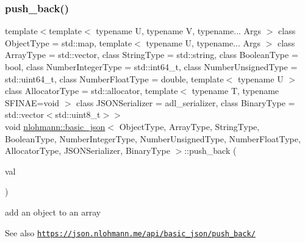 \subsubsection{\texorpdfstring{push\+\_\+back()}{push\_back()}\hspace{0.1cm}{\footnotesize\ttfamily [2/4]}}
{\footnotesize\ttfamily template$<$template$<$ typename U, typename V, typename... Args $>$ class Object\+Type = std\+::map, template$<$ typename U, typename... Args $>$ class Array\+Type = std\+::vector, class String\+Type  = std\+::string, class Boolean\+Type  = bool, class Number\+Integer\+Type  = std\+::int64\+\_\+t, class Number\+Unsigned\+Type  = std\+::uint64\+\_\+t, class Number\+Float\+Type  = double, template$<$ typename U $>$ class Allocator\+Type = std\+::allocator, template$<$ typename T, typename S\+F\+I\+N\+A\+E=void $>$ class J\+S\+O\+N\+Serializer = adl\+\_\+serializer, class Binary\+Type  = std\+::vector$<$std\+::uint8\+\_\+t$>$$>$ \\
void \hyperlink{classnlohmann_1_1basic__json}{nlohmann\+::basic\+\_\+json}$<$ Object\+Type, Array\+Type, String\+Type, Boolean\+Type, Number\+Integer\+Type, Number\+Unsigned\+Type, Number\+Float\+Type, Allocator\+Type, J\+S\+O\+N\+Serializer, Binary\+Type $>$\+::push\+\_\+back (\begin{DoxyParamCaption}\item[{const \hyperlink{classnlohmann_1_1basic__json}{basic\+\_\+json}$<$ Object\+Type, Array\+Type, String\+Type, Boolean\+Type, Number\+Integer\+Type, Number\+Unsigned\+Type, Number\+Float\+Type, Allocator\+Type, J\+S\+O\+N\+Serializer, Binary\+Type $>$ \&}]{val }\end{DoxyParamCaption})\hspace{0.3cm}{\ttfamily [inline]}}



add an object to an array 

\begin{DoxySeeAlso}{See also}
\href{https://json.nlohmann.me/api/basic_json/push_back/}{\tt https\+://json.\+nlohmann.\+me/api/basic\+\_\+json/push\+\_\+back/} 
\end{DoxySeeAlso}
\mbox{\label{classnlohmann_1_1basic__json_ad704839e6a5195e3b76f22e2b9aa63ee}} 
